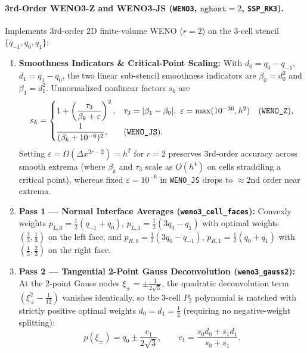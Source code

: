 \documentclass[11pt,a4paper]{article}
\theoremstyle{definition}
\newcommand{\code}[1]{\texttt{#1}}
\begin{document}
\paragraph{3rd-Order WENO3-Z and WENO3-JS (\code{WENO3}, $\code{nghost}=2$, \code{SSP\_RK3}).}
Implements 3rd-order 2D finite-volume WENO ($r = 2$) on the 3-cell stencil $\{q_{-1}, q_0, q_1\}$:
\begin{enumerate}
\item \textbf{Smoothness Indicators \& Critical-Point Scaling:} With $d_0 = q_0 - q_{-1}$, $d_1 = q_1 - q_0$, the two linear sub-stencil smoothness indicators are $\beta_0 = d_0^2$ and $\beta_1 = d_1^2$. Unnormalized nonlinear factors $s_k$ are
\[
s_k = \begin{cases}
1 + \left(\dfrac{\tau_3}{\beta_k + \varepsilon}\right)^2, & \tau_3 = |\beta_1 - \beta_0|,\ \varepsilon = \max(10^{-36}, h^2)\quad (\text{\code{WENO\_Z}}),\\[8pt]
\dfrac{1}{(\beta_k + 10^{-6})^2}, & (\text{\code{WENO\_JS}}).
\end{cases}
\]
Setting $\varepsilon = \Omega(\Delta x^{2r-2}) = h^2$ for $r=2$ preserves 3rd-order accuracy across smooth extrema (where $\beta_k$ and $\tau_3$ scale as $O(h^4)$ on cells straddling a critical point), whereas fixed $\varepsilon = 10^{-6}$ in \code{WENO\_JS} drops to $\approx 2$nd order near extrema.
\item \textbf{Pass 1 — Normal Interface Averages (\code{weno3\_cell\_faces}):} Convexly weights $p_{L,0} = \frac{1}{2}(q_{-1}+q_0)$, $p_{L,1} = \frac{1}{2}(3q_0 - q_1)$ with optimal weights $(\frac{2}{3}, \frac{1}{3})$ on the left face, and $p_{R,0} = \frac{1}{2}(3q_0 - q_{-1})$, $p_{R,1} = \frac{1}{2}(q_0 + q_1)$ with $(\frac{1}{3}, \frac{2}{3})$ on the right face.
\item \textbf{Pass 2 — Tangential 2-Point Gauss Deconvolution (\code{weno3\_gauss2}):} At the 2-point Gauss nodes $\xi_\pm = \pm\frac{1}{2\sqrt{3}}$, the quadratic deconvolution term $(\xi_\pm^2 - \frac{1}{12})$ vanishes identically, so the 3-cell $P_2$ polynomial is matched with strictly positive optimal weights $d_0 = d_1 = \frac{1}{2}$ (requiring no negative-weight splitting):
\[
p(\xi_\pm) = q_0 \pm \frac{c_1}{2\sqrt{3}}, \qquad c_1 = \frac{s_0 d_0 + s_1 d_1}{s_0 + s_1}.
\]
\end{enumerate}
\end{document}
